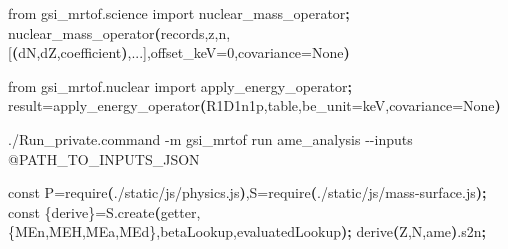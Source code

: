 \documentclass[
  11pt,
  letterpaper,
]{article}
\newenvironment{Shaded}{}{}
\newcommand{\AttributeTok}[1]{\textcolor[rgb]{0.49,0.56,0.16}{#1}}
\newcommand{\DataTypeTok}[1]{\textcolor[rgb]{0.56,0.13,0.00}{#1}}
\newcommand{\ErrorTok}[1]{\textcolor[rgb]{1.00,0.00,0.00}{\textbf{#1}}}
\newcommand{\ExtensionTok}[1]{#1}
\newcommand{\KeywordTok}[1]{\textcolor[rgb]{0.00,0.44,0.13}{\textbf{#1}}}
\newcommand{\NormalTok}[1]{#1}
\newcommand{\OperatorTok}[1]{\textcolor[rgb]{0.40,0.40,0.40}{#1}}
\newcommand{\StringTok}[1]{\textcolor[rgb]{0.25,0.44,0.63}{#1}}
\newcommand{\VariableTok}[1]{\textcolor[rgb]{0.10,0.09,0.49}{#1}}
\begin{document}
\begin{Shaded}
\begin{Highlighting}[]
\ExtensionTok{from}\NormalTok{ gsi\_mrtof.science import nuclear\_mass\_operator}\KeywordTok{;} \ExtensionTok{nuclear\_mass\_operator}\ErrorTok{(}\ExtensionTok{records,z,n,[}\ErrorTok{(}\ExtensionTok{dN,dZ,coefficient}\KeywordTok{)}\ExtensionTok{,...],offset\_keV=0,covariance=None}\KeywordTok{)}
\end{Highlighting}
\end{Shaded}

\begin{Shaded}
\begin{Highlighting}[]
\ExtensionTok{from}\NormalTok{ gsi\_mrtof.nuclear import apply\_energy\_operator}\KeywordTok{;} \VariableTok{result}\OperatorTok{=}\NormalTok{apply\_energy\_operator}\KeywordTok{(}\StringTok{\textquotesingle{}R1D1n1p\textquotesingle{}}\ExtensionTok{,table,be\_unit=}\StringTok{\textquotesingle{}keV\textquotesingle{}}\ExtensionTok{,covariance=None}\KeywordTok{)}
\end{Highlighting}
\end{Shaded}

\begin{Shaded}
\begin{Highlighting}[]
\ExtensionTok{./Run\_private.command} \AttributeTok{{-}m}\NormalTok{ gsi\_mrtof run ame\_analysis }\AttributeTok{{-}{-}inputs}\NormalTok{ @PATH\_TO\_INPUTS\_JSON}
\end{Highlighting}
\end{Shaded}

\begin{Shaded}
\begin{Highlighting}[]
\ExtensionTok{const}\NormalTok{ P=require}\ErrorTok{(}\StringTok{\textquotesingle{}./static/js/physics.js\textquotesingle{}}\KeywordTok{)}\ExtensionTok{,S=require}\ErrorTok{(}\StringTok{\textquotesingle{}./static/js/mass{-}surface.js\textquotesingle{}}\KeywordTok{);} \ExtensionTok{const}\NormalTok{ \{derive\}=S.create}\ErrorTok{(}\ExtensionTok{getter,}\DataTypeTok{\{MEn}\OperatorTok{,}\DataTypeTok{MEH}\OperatorTok{,}\DataTypeTok{MEa}\OperatorTok{,}\DataTypeTok{MEd\}}\ExtensionTok{,betaLookup,evaluatedLookup}\KeywordTok{);} \ExtensionTok{derive}\ErrorTok{(}\ExtensionTok{Z,N,}\StringTok{\textquotesingle{}ame\textquotesingle{}}\KeywordTok{)}\ExtensionTok{.s2n}\KeywordTok{;}
\end{Highlighting}
\end{Shaded}
\end{document}

